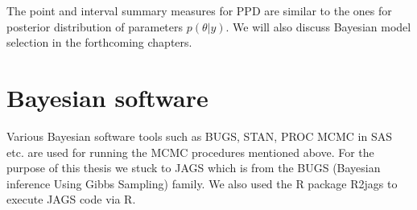 The point and interval summary measures for PPD are similar to the ones for posterior distribution of parameters $p(\theta|y)$. We will also discuss Bayesian model selection in the forthcoming chapters.

\section{Bayesian software}
Various Bayesian software tools such as BUGS, STAN, PROC MCMC in SAS etc. are used for running the MCMC procedures mentioned above. For the purpose of this thesis we stuck to JAGS which is from the BUGS (Bayesian inference Using Gibbs Sampling) family. We also used the R package R2jags to execute JAGS code via R.